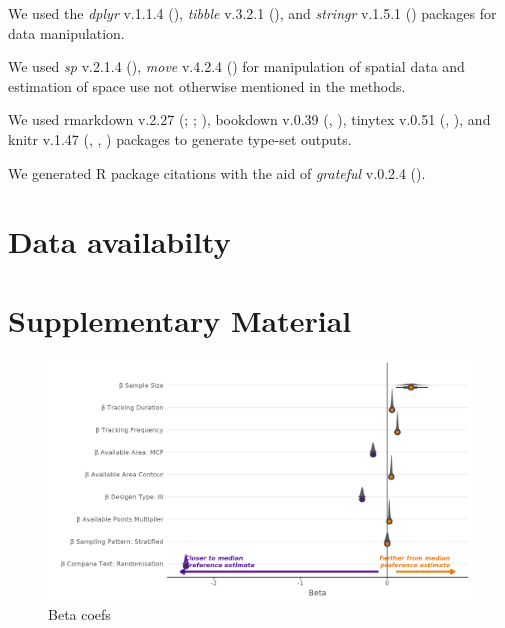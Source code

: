 \documentclass[10pt,a4paper]{article}
\begin{document}
We used the \emph{dplyr} v.1.1.4 (), \emph{tibble} v.3.2.1 (),
and \emph{stringr} v.1.5.1 () packages for data manipulation.

We used \emph{sp} v.2.1.4 (), \emph{move} v.4.2.4 () for manipulation of spatial data and estimation of space use not otherwise mentioned in the methods.

We used rmarkdown v.2.27 (; ; ), bookdown v.0.39 (, ), tinytex v.0.51 (, ), and knitr v.1.47 (, , ) packages to generate type-set outputs.

We generated R package citations with the aid of \emph{grateful} v.0.2.4 ().

\section{Data availabilty}\label{data-availabilty}

\clearpage

\section{Supplementary Material}\label{supplementary-material}

\begin{figure}
\includegraphics[width=1\linewidth]{../figures/areaBrms_effectsPlot} \caption{Beta coefs}\label{fig:effectPlotArea}
\end{figure}
\end{document}
